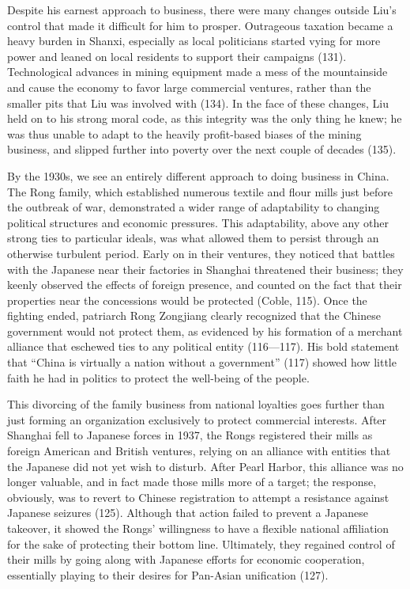 Despite his earnest approach to business, there were many
changes outside Liu's control that made it difficult for him to
prosper. Outrageous taxation became a heavy burden in Shanxi,
especially as local politicians started vying for more power and
leaned on local residents to support their campaigns (131).
Technological advances in mining equipment made a mess of the
mountainside and cause the economy to favor large commercial
ventures, rather than the smaller pits that Liu was involved
with (134). In the face of these changes, Liu held on to his
strong moral code, as this integrity was the only thing he knew;
he was thus unable to adapt to the heavily profit-based biases
of the mining business, and slipped further into poverty over
the next couple of decades (135).

By the 1930s, we see an entirely different approach to doing
business in China. The Rong family, which established
numerous textile and flour mills just before the outbreak of
war, demonstrated a wider range of adaptability to changing
political structures and economic pressures. This
adaptability, above any other strong ties to particular
ideals, was what allowed them to persist through an
otherwise turbulent period. Early on in their ventures, they
noticed that battles with the Japanese near their factories
in Shanghai threatened their business; they keenly observed
the effects of foreign presence, and counted on the fact
that their properties near the concessions would be
protected (Coble, 115). Once the fighting ended, patriarch
Rong Zongjiang clearly recognized that  the Chinese
government would not protect them, as evidenced by his
formation of a merchant alliance that eschewed ties to any
political entity (116—117). His bold statement that “China
is virtually a nation without a government” (117) showed how
little faith he had in politics to protect the well-being of
the people.

This divorcing of the family business from national
loyalties goes further than just forming an organization
exclusively to protect commercial interests. After
Shanghai fell to Japanese forces in 1937, the Rongs
registered their mills as foreign American and British
ventures, relying on an alliance with entities that the
Japanese did not yet wish to disturb. After Pearl
Harbor, this alliance was no longer valuable, and in
fact made those mills more of a target; the response,
obviously, was to revert to Chinese registration to
attempt a resistance against Japanese seizures (125).
Although that action failed to prevent a Japanese
takeover, it showed the Rongs' willingness to have a
flexible national affiliation for the sake of protecting
their bottom line. Ultimately, they regained control of
their mills by going along with Japanese efforts for
economic cooperation, essentially playing to their
desires for Pan-Asian unification (127).

